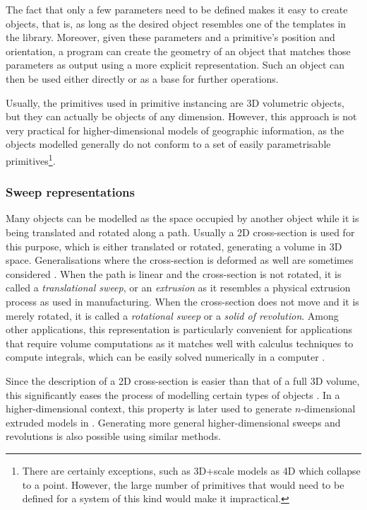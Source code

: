 The fact that only a few parameters need to be defined makes it easy to create objects, that is, as long as the desired object resembles one of the templates in the library.
Moreover, given these parameters and a primitive's position and orientation, a program can create the geometry of an object that matches those parameters as output using a more explicit representation.
Such an object can then be used either directly or as a base for further operations.

Usually, the primitives used in primitive instancing are 3D volumetric objects, but they can actually be objects of any dimension.
However, this approach is not very practical for higher-dimensional models of geographic information, as the objects modelled generally do not conform to a set of easily parametrisable primitives\footnote{There are certainly exceptions, such as 3D+scale models as 4D which collapse to a point.
However, the large number of primitives that would need to be defined for a system of this kind would make it impractical.}.

\subsubsection{Sweep representations}

Many objects can be modelled as the space occupied by another object while it is being translated and rotated along a path.
Usually a 2D cross-section is used for this purpose, which is either translated or rotated, generating a volume in 3D space.
Generalisations where the cross-section is deformed as well are sometimes considered \citep{Blackmore94}.
When the path is linear and the cross-section is not rotated, it is called a \emph{translational sweep}, or an \emph{extrusion} as it resembles a physical extrusion process as used in manufacturing.
When the cross-section does not move and it is merely rotated, it is called a \emph{rotational sweep} or a \emph{solid of revolution}.
Among other applications, this representation is particularly convenient for applications that require volume computations as it matches well with calculus techniques to compute integrals, which can be easily solved numerically in a computer \citep{Lee82}.

Since the description of a 2D cross-section is easier than that of a full 3D volume, this significantly eases the process of modelling certain types of objects \citep{Weld90}.
In a higher-dimensional context, this property is later used to generate $n$-dimensional extruded models in .
Generating more general higher-dimensional sweeps and revolutions is also possible using similar methods.

